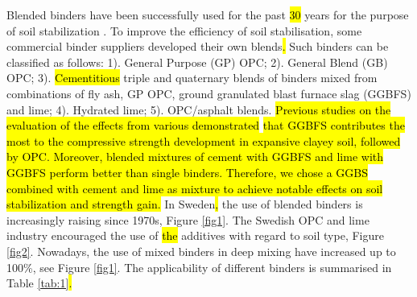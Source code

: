 \documentclass[eprint,
]{actapoly}
\begin{document}
Blended binders have been successfully used for the past \hl{30} years for the purpose of soil stabilization \cite{Ghazy,Consolietal2019,Lindh2001,Leeetal2019,Filho,Yietal2014,Guetal2014,Yangetal2015}. To improve the efficiency of soil stabilisation, some commercial binder suppliers developed their own blends\hl{. }Such binders can be classified as follows: 1). General Purpose (GP) OPC; 2). General Blend (GB) OPC; 3). \hl{Cementitious }triple and quaternary blends of binders mixed from combinations of fly ash, GP OPC, ground granulated blast furnace slag (GGBFS) and lime; 4). Hydrated lime; 5). OPC/asphalt blends. \hl{Previous studies on the evaluation of the effects from various demonstrated} \cite{ma15217798} \hl{that GGBFS contributes the most to the compressive strength development in expansive clayey soil, followed by OPC. Moreover, blended mixtures of cement with GGBFS and lime with GGBFS perform better than single binders. Therefore, we chose a GGBS combined with cement and lime as mixture to achieve notable effects on soil stabilization and strength gain. }In Sweden\hl{, }the use of blended binders is increasingly raising since 1970s, Figure \ref{fig1}. The Swedish OPC and lime industry encouraged the use of \hl{the }additives with regard to soil type, Figure \ref{fig2}. Nowadays, the use of mixed binders in deep mixing have increased up to 100\%, see Figure \ref{fig1}.\hl{ }The applicability of different binders is summarised in Table \ref{tab:1}\hl{.} 
\end{document}
